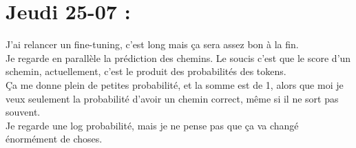 \documentclass{article}
\begin{document}
\section*{Jeudi 25-07 :}
J'ai relancer un fine-tuning, c'est long mais ça sera assez bon à la fin.\\
Je regarde en parallèle la prédiction des chemins. Le soucis c'est que le score d'un schemin, actuellement, c'est le produit des probabilités des tokens.\\
Ça me donne plein de petites probabilité, et la somme est de 1, alors que moi je veux seulement la probabilité d'avoir un chemin correct, même si il ne sort pas souvent.\\
Je regarde une log probabilité, mais je ne pense pas que ça va changé énormément de choses.\\
\end{document}
